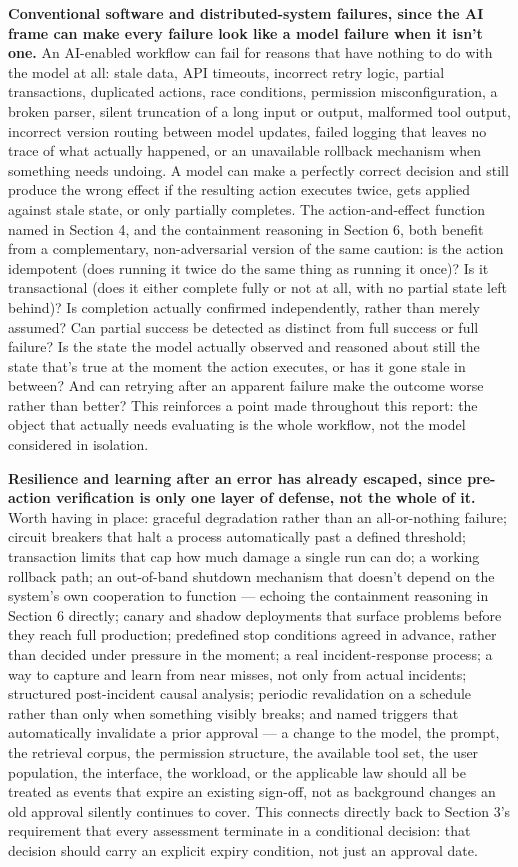 \textbf{Conventional software and distributed-system failures, since the AI frame can make every failure look like a model failure when it isn't one.} An AI-enabled workflow can fail for reasons that have nothing to do with the model at all: stale data, API timeouts, incorrect retry logic, partial transactions, duplicated actions, race conditions, permission misconfiguration, a broken parser, silent truncation of a long input or output, malformed tool output, incorrect version routing between model updates, failed logging that leaves no trace of what actually happened, or an unavailable rollback mechanism when something needs undoing. A model can make a perfectly correct decision and still produce the wrong effect if the resulting action executes twice, gets applied against stale state, or only partially completes. The action-and-effect function named in Section 4, and the containment reasoning in Section 6, both benefit from a complementary, non-adversarial version of the same caution: is the action idempotent (does running it twice do the same thing as running it once)? Is it transactional (does it either complete fully or not at all, with no partial state left behind)? Is completion actually confirmed independently, rather than merely assumed? Can partial success be detected as distinct from full success or full failure? Is the state the model actually observed and reasoned about still the state that's true at the moment the action executes, or has it gone stale in between? And can retrying after an apparent failure make the outcome worse rather than better? This reinforces a point made throughout this report: the object that actually needs evaluating is the whole workflow, not the model considered in isolation.

\textbf{Resilience and learning after an error has already escaped, since pre-action verification is only one layer of defense, not the whole of it.} Worth having in place: graceful degradation rather than an all-or-nothing failure; circuit breakers that halt a process automatically past a defined threshold; transaction limits that cap how much damage a single run can do; a working rollback path; an out-of-band shutdown mechanism that doesn't depend on the system's own cooperation to function --- echoing the containment reasoning in Section 6 directly; canary and shadow deployments that surface problems before they reach full production; predefined stop conditions agreed in advance, rather than decided under pressure in the moment; a real incident-response process; a way to capture and learn from near misses, not only from actual incidents; structured post-incident causal analysis; periodic revalidation on a schedule rather than only when something visibly breaks; and named triggers that automatically invalidate a prior approval --- a change to the model, the prompt, the retrieval corpus, the permission structure, the available tool set, the user population, the interface, the workload, or the applicable law should all be treated as events that expire an existing sign-off, not as background changes an old approval silently continues to cover. This connects directly back to Section 3's requirement that every assessment terminate in a conditional decision: that decision should carry an explicit expiry condition, not just an approval date.

